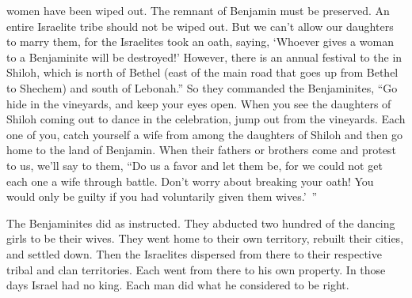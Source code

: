{women
have been wiped out.
The remnant
of Benjamin
must be preserved.
An entire Israelite
tribe
should not
be wiped out.
But we
can’t
allow
our daughters
to marry
them, for
the Israelites
took an oath,
saying,
‘Whoever gives
a woman
to a Benjaminite
will be destroyed!’
However, there is
an annual
festival
to the
{}
in Shiloh,
which
is north
of Bethel
(east
of the main road
that goes up
from Bethel
to Shechem) and south
of Lebonah.”
So they commanded
the Benjaminites,
“Go
hide
in the vineyards,
and keep your eyes open. When
you see
the daughters
of Shiloh
coming
out
to dance
in the celebration, jump out
from
the vineyards.
Each one
of you, catch
yourself a wife
from among the daughters
of Shiloh
and then go
home to the land
of Benjamin.
When
their fathers
or
brothers
come
and protest
to
us, we’ll say
to
them, “Do us a favor
and let them
be, for
we
could not
get
each
one a wife
through battle.
Don’t worry about breaking your oath! You
would only be guilty
if you had voluntarily
given
them wives.’ ”
\par }{\PP {}The Benjaminites
did
as instructed.
They abducted
two hundred of the dancing girls to be their wives.
They went
home
to
their own territory,
rebuilt
their cities,
and settled down.
Then
the Israelites
dispersed
from there
to their respective
tribal
and clan
territories.
Each
went
from there
to his own
property.
In those
days
Israel
had no
king.
Each man
did
what he considered to be right.
\par }